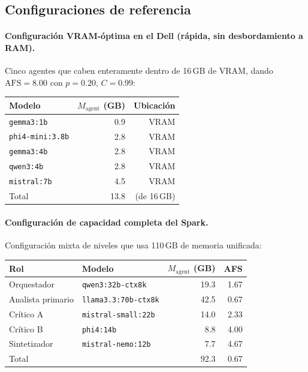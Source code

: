 \subsection{Configuraciones de referencia}

\paragraph{Configuración VRAM-óptima en el Dell (rápida, sin desbordamiento a RAM).}
Cinco agentes que caben enteramente dentro de 16\,GB de VRAM, dando
$\text{AFS} = 8.00$ con $p = 0.20$, $C = 0.99$:

\begin{center}
\begin{tabular}{lrr}
\toprule
Modelo & $M_{\text{agent}}$ (GB) & Ubicación \\
\midrule
\texttt{gemma3:1b}    & 0.9 & VRAM \\
\texttt{phi4-mini:3.8b} & 2.8 & VRAM \\
\texttt{gemma3:4b}    & 2.8 & VRAM \\
\texttt{qwen3:4b}     & 2.8 & VRAM \\
\texttt{mistral:7b}   & 4.5 & VRAM \\
\midrule
Total & 13.8 & (de 16\,GB) \\
\bottomrule
\end{tabular}
\end{center}

\paragraph{Configuración de capacidad completa del Spark.}
Configuración mixta de niveles que usa 110\,GB de memoria unificada:

\begin{center}
\begin{tabular}{llrr}
\toprule
Rol & Modelo & $M_{\text{agent}}$ (GB) & AFS \\
\midrule
Orquestador     & \texttt{qwen3:32b-ctx8k}            & 19.3 & 1.67 \\
Analista primario & \texttt{llama3.3:70b-ctx8k}         & 42.5 & 0.67 \\
Crítico A        & \texttt{mistral-small:22b}           & 14.0 & 2.33 \\
Crítico B        & \texttt{phi4:14b}                   &  8.8 & 4.00 \\
Sintetizador     & \texttt{mistral-nemo:12b}            &  7.7 & 4.67 \\
\midrule
Total           &                                      & 92.3 & 0.67 \\
\bottomrule
\end{tabular}
\end{center}

